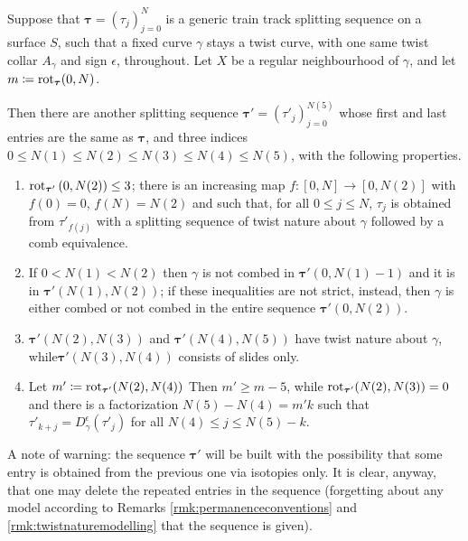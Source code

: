\begin{prop}\label{prp:rearrang1}
Suppose that $\bm\tau=(\tau_j)_{j=0}^N$ is a generic train track splitting sequence on a surface $S$, such that a fixed curve $\gamma$ stays a twist curve, with one same twist collar $A_\gamma$ and sign $\epsilon$, throughout. Let $X$ be a regular neighbourhood of $\gamma$, and let $m\coloneqq\mathrm{rot}_{\bm\tau}(0,N)$.%

Then there are another splitting sequence $\bm{\tau'}=(\tau'_j)_{j=0}^{N(5)}$ whose first and last entries are the same as $\bm\tau$, and three indices $0\leq N(1)\leq N(2)\leq N(3)\leq N(4) \leq N(5)$, with the following properties.
\begin{enumerate}
\item $\mathrm{rot}_{\bm\tau'}\left(0,N(2)\right)\leq 3$; there is an increasing map $f: [0,N]\rightarrow [0,N(2)]$ with $f(0)=0$, $f(N)=N(2)$ and such that, for all $0\leq j \leq N$, $\tau_j$ is obtained from $\tau'_{f(j)}$ with a splitting sequence of twist nature about $\gamma$ followed by a comb equivalence.
\item If $0<N(1)<N(2)$ then $\gamma$ is not combed in $\bm\tau'\left(0,N(1)-1\right)$ and it is in $\bm\tau'\left(N(1),N(2)\right)$; if these inequalities are not strict, instead, then $\gamma$ is either combed or not combed in the entire sequence $\bm\tau'\left(0,N(2)\right)$.
\item $\bm\tau'\left(N(2),N(3)\right)$ and $\bm\tau'\left(N(4),N(5)\right)$ have twist nature about $\gamma$, while\linebreak $\bm\tau'(N(3),N(4))$ consists of slides only.
\item Let $m'\coloneqq \mathrm{rot}_{\bm\tau'}(N(2),N(4))$ Then $m'\geq m-5$, while $\mathrm{rot}_{\bm\tau'}(N(2),N(3))=0$ and there is a factorization $N(5)-N(4)=m'k$ such that $\tau'_{k+j}=D_\gamma^\epsilon(\tau'_j)$ for all $N(4)\leq j\leq N(5)-k$.
\end{enumerate}
\end{prop}

A note of warning: the sequence $\bm\tau'$ will be built with the possibility that some entry is obtained from the previous one via isotopies only. It is clear, anyway, that one may delete the repeated entries in the sequence (forgetting about any model according to Remarks \ref{rmk:permanenceconventions} and \ref{rmk:twistnaturemodelling} that the sequence is given).


